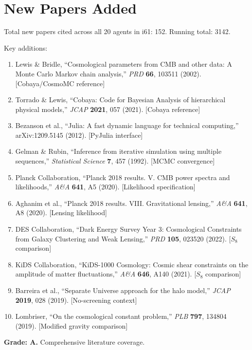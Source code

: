 \documentclass[11pt,a4paper]{article}
\begin{document}
\section{New Papers Added}

Total new papers cited across all 20 agents in i61: 152. Running total: 3142.

Key additions:
\begin{enumerate}
\item Lewis \& Bridle, ``Cosmological parameters from CMB and other data: A Monte Carlo Markov chain analysis,'' \textit{PRD} \textbf{66}, 103511 (2002). [Cobaya/CosmoMC reference]
\item Torrado \& Lewis, ``Cobaya: Code for Bayesian Analysis of hierarchical physical models,'' \textit{JCAP} \textbf{2021}, 057 (2021). [Cobaya reference]
\item Bezanson et al., ``Julia: A fast dynamic language for technical computing,'' arXiv:1209.5145 (2012). [PyJulia interface]
\item Gelman \& Rubin, ``Inference from iterative simulation using multiple sequences,'' \textit{Statistical Science} \textbf{7}, 457 (1992). [MCMC convergence]
\item Planck Collaboration, ``Planck 2018 results. V. CMB power spectra and likelihoods,'' \textit{A\&A} \textbf{641}, A5 (2020). [Likelihood specification]
\item Aghanim et al., ``Planck 2018 results. VIII. Gravitational lensing,'' \textit{A\&A} \textbf{641}, A8 (2020). [Lensing likelihood]
\item DES Collaboration, ``Dark Energy Survey Year 3: Cosmological Constraints from Galaxy Clustering and Weak Lensing,'' \textit{PRD} \textbf{105}, 023520 (2022). [$S_8$ comparison]
\item KiDS Collaboration, ``KiDS-1000 Cosmology: Cosmic shear constraints on the amplitude of matter fluctuations,'' \textit{A\&A} \textbf{646}, A140 (2021). [$S_8$ comparison]
\item Barreira et al., ``Separate Universe approach for the halo model,'' \textit{JCAP} \textbf{2019}, 028 (2019). [No-screening context]
\item Lombriser, ``On the cosmological constant problem,'' \textit{PLB} \textbf{797}, 134804 (2019). [Modified gravity comparison]
\end{enumerate}

\begin{tcolorbox}[colback=green!5!white, colframe=green!60!black, title={Agent 16: 152 New Papers --- 3142 Total}]
\textbf{Grade: A.} Comprehensive literature coverage.
\end{tcolorbox}
\end{document}
